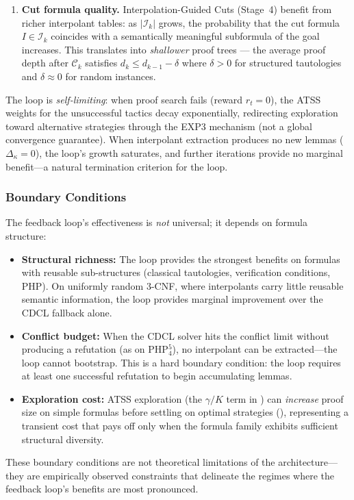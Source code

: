 \documentclass[acmtocl,review,anonymous]{acmart}
\begin{document}
\begin{enumerate}
  \item \textbf{Cut formula quality.}
    Interpolation-Guided Cuts (Stage~4) benefit from richer
    interpolant tables: as $|\mathcal{I}_k|$ grows, the probability
    that the cut formula $I \in \mathcal{I}_k$ coincides with a
    semantically meaningful subformula of the goal increases.  This
    translates into \emph{shallower} proof trees --- the average
    proof depth after $\mathcal{C}_k$ satisfies
    $d_k \le d_{k-1} - \delta$ where $\delta > 0$ for structured
    tautologies and $\delta \approx 0$ for random instances.
\end{enumerate}

The loop is \emph{self-limiting}: when proof search fails
(reward $r_t = 0$), the ATSS weights for the unsuccessful tactics
decay exponentially, redirecting exploration toward alternative
strategies through the EXP3 mechanism (not a global convergence
guarantee).  When interpolant extraction produces no new lemmas
($\Delta_\kappa = 0$), the loop's growth saturates, and further
iterations provide no marginal benefit---a natural termination
criterion for the loop.

\subsubsection*{Boundary Conditions}

The feedback loop's effectiveness is \emph{not} universal; it depends
on formula structure:
\begin{itemize}
  \item \textbf{Structural richness:} The loop provides the strongest
    benefits on formulas with reusable sub-structures
    (classical tautologies, verification conditions, PHP).
    On uniformly random 3-CNF, where interpolants carry little
    reusable semantic information, the loop provides marginal
    improvement over the CDCL fallback alone.
  \item \textbf{Conflict budget:} When the CDCL solver hits the
    conflict limit without producing a refutation (as on PHP$_4^5$),
    no interpolant can be extracted---the loop cannot bootstrap.
    This is a hard boundary condition: the loop requires at least
    one successful refutation to begin accumulating lemmas.
  \item \textbf{Exploration cost:} ATSS exploration (the $\gamma/K$
    term in ) can \emph{increase} proof size on
    simple formulas before settling on optimal strategies
    (), representing a transient cost
    that pays off only when the formula family exhibits sufficient
    structural diversity.
\end{itemize}
These boundary conditions are not theoretical limitations of the
architecture---they are empirically observed constraints that
delineate the regimes where the feedback loop's benefits are most
pronounced.
\end{document}
